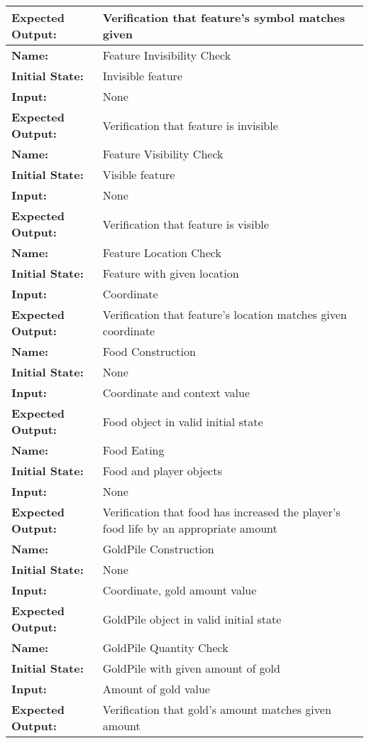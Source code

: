 \documentclass[12pt, titlepage]{article}
\begin{document}
\begin{center}
\begin{longtable}{ l | l }
\textbf{Expected Output:} & Verification that feature's symbol matches given\\
\hline
\textbf{Name:} & Feature Invisibility Check\\
\textbf{Initial State:} & Invisible feature\\
\textbf{Input:} & None\\
\textbf{Expected Output:} & Verification that feature is invisible\\
\hline
\textbf{Name:} & Feature Visibility Check\\
\textbf{Initial State:} & Visible feature\\
\textbf{Input:} & None\\
\textbf{Expected Output:} & Verification that feature is visible\\
\hline
\textbf{Name:} & Feature Location Check\\
\textbf{Initial State:} & Feature with given location\\
\textbf{Input:} & Coordinate\\
\textbf{Expected Output:} & Verification that feature's location matches given coordinate\\
\hline
\textbf{Name:} & Food Construction\\
\textbf{Initial State:} & None\\
\textbf{Input:} & Coordinate and context value\\
\textbf{Expected Output:} & Food object in valid initial state\\
\hline
\textbf{Name:} & Food Eating\\
\textbf{Initial State:} & Food and player objects\\
\textbf{Input:} & None\\
\textbf{Expected Output:} & Verification that food has increased the player's food life by an appropriate amount\\
\hline
\textbf{Name:} & GoldPile Construction\\
\textbf{Initial State:} & None\\
\textbf{Input:} & Coordinate, gold amount value\\
\textbf{Expected Output:} & GoldPile object in valid initial state\\
\hline
\textbf{Name:} & GoldPile Quantity Check\\
\textbf{Initial State:} & GoldPile with given amount of gold\\
\textbf{Input:} & Amount of gold value\\
\textbf{Expected Output:} & Verification that gold's amount matches given amount\\

\end{longtable}
\end{center}
\end{document}
